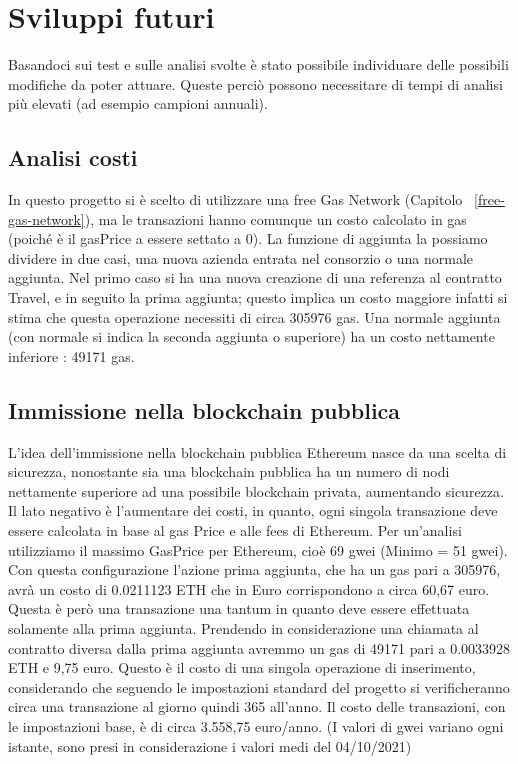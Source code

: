 \documentclass[11pt,a4paper,titlepage,twoside,openright]{report}
\begin{document}
\chapter{Sviluppi futuri}
Basandoci sui test e sulle analisi svolte è stato possibile individuare delle possibili modifiche da poter attuare. Queste perciò possono necessitare di tempi di analisi più elevati (ad esempio campioni annuali).

\section{Analisi costi}
In questo progetto si è scelto di utilizzare una free Gas Network (Capitolo ~\ref{free-gas-network}), ma le transazioni hanno comunque un costo calcolato in gas (poiché è il gasPrice a essere settato a 0). La funzione di aggiunta la possiamo dividere in due casi, una nuova azienda entrata nel consorzio o una normale aggiunta. Nel primo caso si ha una nuova creazione di una referenza al contratto Travel, e in seguito la prima aggiunta; questo implica un costo maggiore infatti si stima che questa operazione necessiti di circa 305976 gas. Una normale aggiunta (con normale si indica la seconda aggiunta o superiore) ha un costo nettamente inferiore : 49171 gas.
 
\section{Immissione nella blockchain pubblica}
L'idea dell'immissione nella blockchain pubblica Ethereum nasce da una scelta di sicurezza, nonostante sia una blockchain pubblica ha un numero di nodi nettamente superiore ad una possibile blockchain privata, aumentando sicurezza. Il lato negativo è l'aumentare dei costi, in quanto, ogni singola transazione deve essere calcolata in base al gas Price e alle fees di Ethereum. Per un'analisi utilizziamo il massimo GasPrice per Ethereum, cioè 69 gwei (Minimo = 51 gwei). Con questa configurazione l'azione prima aggiunta, che ha un gas pari a 305976, avrà un costo di 0.0211123 ETH che in Euro corrispondono a circa 60,67 euro. Questa è però una transazione una tantum in quanto deve essere effettuata solamente alla prima aggiunta. Prendendo in considerazione una chiamata al contratto diversa dalla prima aggiunta avremmo un gas di   49171 pari a 0.0033928 ETH e 9,75 euro. Questo è il costo di una singola operazione di inserimento, considerando che seguendo le impostazioni standard del progetto si verificheranno circa una transazione al giorno quindi 365 all'anno. Il costo delle transazioni, con le impostazioni base, è di circa 3.558,75 euro/anno.
(I valori di gwei variano ogni istante, sono presi in considerazione i valori medi del 04/10/2021)
\end{document}
